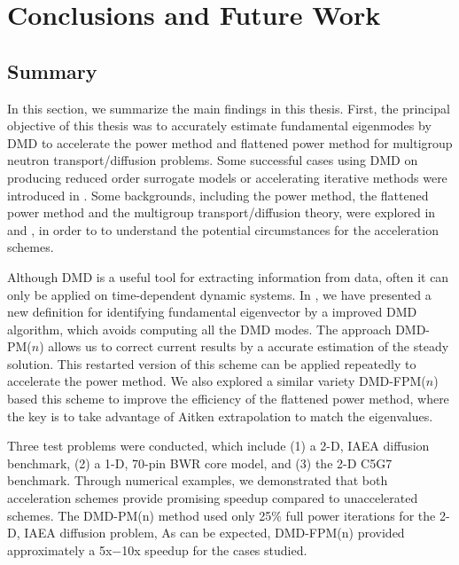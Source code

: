 
\cleardoublepage


\chapter{Conclusions and Future Work}
\label{chapter:conclusion}
\section{Summary}
In this section, we summarize the main findings in this thesis.
First, the principal objective of this thesis was to accurately estimate fundamental eigenmodes by DMD to accelerate the power method and flattened power method for multigroup neutron transport/diffusion problems.
Some successful cases using DMD on producing reduced order surrogate models or accelerating iterative methods were introduced in .
Some backgrounds, including the power method, the flattened power method and the multigroup transport/diffusion theory, were explored in  and , in order to to understand the potential circumstances for the acceleration schemes.

Although DMD is a useful tool for extracting information from data, often it can only be applied on time-dependent dynamic systems. 
In , we have presented a new definition for identifying fundamental eigenvector by a improved DMD algorithm, which avoids computing all the DMD modes.   
The approach DMD-PM($n$) allows us to correct current results by a accurate estimation of the steady solution. 
This restarted version of this scheme can be applied repeatedly to accelerate the power method.
We also explored a similar variety DMD-FPM($n$) based this scheme to improve the efficiency of the flattened power method, where the key is to take advantage of Aitken extrapolation to match the eigenvalues.

Three test problems were conducted, which include (1) a 2-D, IAEA diffusion benchmark, (2) a 1-D, 70-pin BWR core model, and (3) the 2-D C5G7 benchmark.
Through numerical examples, we demonstrated that both acceleration schemes provide promising speedup compared to unaccelerated schemes. 
The DMD-PM(n) method used only 25\% full power iterations for the 2-D, IAEA diffusion problem, As can be expected, DMD-FPM(n) provided approximately a 5x$-$10x speedup for the cases studied.

